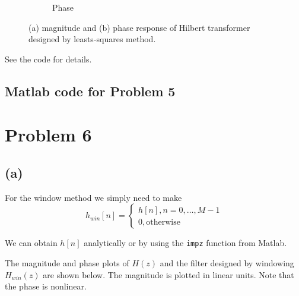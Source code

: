 \documentclass{article}
\begin{document}
\begin{figure}[h!]
\begin{subfigure}[h!]{0.5\textwidth}
		\caption{Phase}
	\end{subfigure}
	\caption{(a) magnitude and (b) phase response of Hilbert transformer designed by leasts-squares method.}
\end{figure}
\FloatBarrier

See the code for details.

\subsection{Matlab code for Problem 5}


\newpage
\section{Problem 6}
\subsection{(a)}

For the window method we simply need to make
\begin{equation}
	h_{win}[n] = \begin{cases}
	h[n], n = 0, \ldots, M-1 \\
	0, \text{otherwise}
	\end{cases}
\end{equation}

We can obtain $h[n]$ analytically or by using the \texttt{impz} function from Matlab. 

The magnitude and phase plots of $H(z)$ and the filter designed by windowing $H_{win}(z)$ are shown below. The magnitude is plotted in linear units. Note that the phase is nonlinear.
\end{document}
